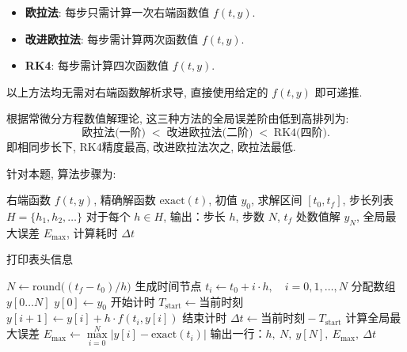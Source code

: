 \documentclass[zihao=-4,a4paper]{ctexart}
\begin{document}
\begin{itemize}
    \item \textbf{欧拉法}: 每步只需计算一次右端函数值 $f(t, y)$. 
    \item \textbf{改进欧拉法}: 每步需计算两次函数值 $f(t, y)$. 
    \item \textbf{RK4}: 每步需计算四次函数值 $f(t, y)$. 
\end{itemize}
以上方法均无需对右端函数解析求导, 直接使用给定的 $f(t, y)$ 即可递推. 


根据常微分方程数值解理论, 这三种方法的全局误差阶由低到高排列为: 
\[
    \text{欧拉法(一阶)} \;<\; \text{改进欧拉法(二阶)} \;<\; \text{RK4(四阶)}.
\]
即相同步长下, RK4精度最高, 改进欧拉法次之, 欧拉法最低. 



针对本题, 算法步骤为:
\begin{center}
\begin{minipage}{0.9\textwidth}
\begin{algorithm}[H]
\caption{显式欧拉法求解 $y' = f(t,y)$, $y(t_0)=y_0$, $t \in [t_0, t_f]$}
\begin{algorithmic}[1]
  \Require 右端函数 $f(t,y)$, 精确解函数 $\text{exact}(t)$, 初值 $y_0$, 
          求解区间 $[t_0, t_f]$, 步长列表 $H = \{h_1, h_2, \dots\}$
  \Ensure 对于每个 $h \in H$, 输出：步长 $h$, 步数 $N$, $t_f$ 处数值解 $y_N$, 
          全局最大误差 $E_{\max}$, 计算耗时 $\Delta t$

  \State 打印表头信息

      \State $N \gets \text{round}\big((t_f - t_0) / h\big)$
      \State 生成时间节点 $t_i \gets t_0 + i \cdot h,\quad i = 0,1,\dots,N$
      \State 分配数组 $y[0 \ldots N]$
      \State $y[0] \gets y_0$
      \State 开始计时 $T_{\text{start}} \gets \text{当前时刻}$
          \State $y[i+1] \gets y[i] + h \cdot f(t_i, y[i])$
      \EndFor
      \State 结束计时 $\Delta t \gets \text{当前时刻} - T_{\text{start}}$
      \State 计算全局最大误差 $E_{\max} \gets \max\limits_{i=0}^{N} |y[i] - \text{exact}(t_i)|$
      \State 输出一行：$h,\ N,\ y[N],\ E_{\max},\ \Delta t$
  \EndFor
\end{algorithmic}
\end{algorithm}
\end{minipage}
\end{center}
\end{document}
